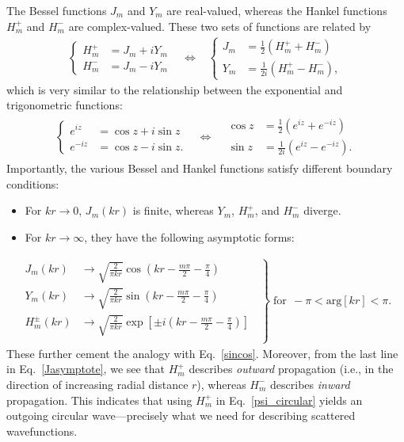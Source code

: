 \documentclass[prx,12pt]{revtex4-2}
\begin{document}
The Bessel functions $J_m$ and $Y_m$ are real-valued, whereas the
Hankel functions $H_m^+$ and $H_m^-$ are complex-valued.  These two
sets of functions are related by
\begin{align}
  \left\{
  \begin{aligned}
    H_m^+ &= J_m + i Y_m \\
    H_m^- &= J_m - i Y_m
  \end{aligned}\right.
  \;\;\;\Leftrightarrow\;\;\;
  \left\{
  \begin{aligned}
    J_m &=  \frac{1}{2}\left( H_m^+ + H_m^- \right)\\
    Y_m &=  \frac{1}{2i}\left( H_m^+ - H_m^- \right),
  \end{aligned}\right.
  \label{JYHrelation}
\end{align}
which is very similar to the relationship between the exponential and
trigonometric functions:
\begin{align}
  \left\{
  \begin{aligned}
  e^{iz} &= \cos z + i \sin z \\
  e^{-iz} &= \cos z - i \sin z.
  \end{aligned}\right.
  \;\;\;\Leftrightarrow\;\;\;
  \begin{aligned}
    \cos z  &= \frac{1}{2} \left(e^{iz} + e^{-iz}\right) \\
    \sin z &= \frac{1}{2i} \left(e^{iz} - e^{-iz}\right).
  \end{aligned}
  \label{sincos}
\end{align}
Importantly, the various Bessel and Hankel functions satisfy different
boundary conditions:
\begin{itemize}
\item For $kr \rightarrow 0$, $J_m(kr)$ is finite, whereas $Y_m$,
  $H_m^+$, and $H_m^-$ diverge.

\item For $kr \rightarrow \infty$, they have the following asymptotic forms:
\end{itemize}
\begin{align}
  \left.
  \begin{aligned}
    J_m(kr) &\rightarrow
    \sqrt{\frac{2}{\pi kr}} \cos\!\left(kr - \frac{m\pi}{2} - \frac{\pi}{4}\right) \\
    Y_m(kr) &\rightarrow
    \sqrt{\frac{2}{\pi kr}} \sin\!\left(kr - \frac{m\pi}{2} - \frac{\pi}{4}\right) \\
    H_m^\pm(kr) &\rightarrow
    \sqrt{\frac{2}{\pi kr}}
    \exp\left[\pm i\left(kr - \frac{m\pi}{2} - \frac{\pi}{4}\right)\right] \\
  \end{aligned}\;\;
  \right\}
  \; \text{for}\;\, -\pi < \mathrm{arg}[kr] < \pi.
  \label{Jasymptote}
\end{align}
These further cement the analogy with Eq.~\eqref{sincos}.  Moreover,
from the last line in Eq.~\eqref{Jasymptote}, we see that $H_m^+$
describes \textit{outward} propagation (i.e., in the direction of
increasing radial distance $r$), whereas $H_m^-$ describes
\textit{inward} propagation.  This indicates that using $H_m^+$ in
Eq.~\eqref{psi_circular} yields an outgoing circular wave---precisely
what we need for describing scattered wavefunctions.
\end{document}
